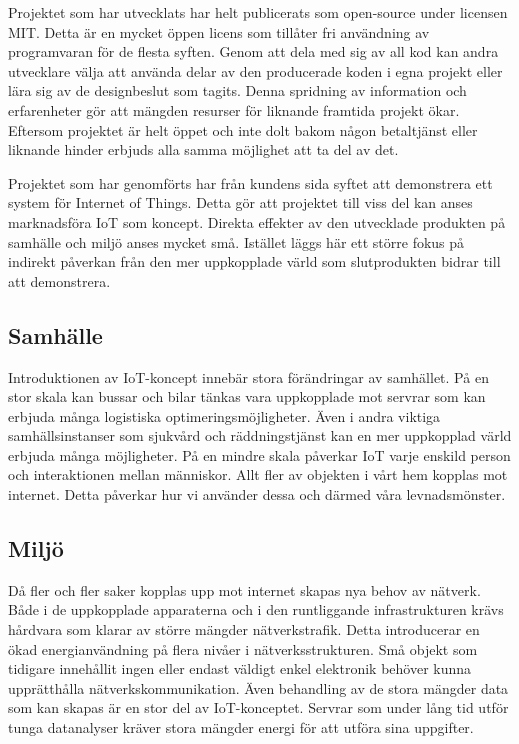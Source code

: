 Projektet som har utvecklats har helt publicerats som open-source under licensen MIT\cite{MIT-license}. Detta är en mycket öppen licens som tillåter fri användning av programvaran för de flesta syften. Genom att dela med sig av all kod kan andra utvecklare välja att använda delar av den producerade koden i egna projekt eller lära sig av de designbeslut som tagits. Denna spridning av information och erfarenheter gör att mängden resurser för liknande framtida projekt ökar. Eftersom projektet är helt öppet och inte dolt bakom någon betaltjänst eller liknande hinder erbjuds alla samma möjlighet att ta del av det.

Projektet som har genomförts har från kundens sida syftet att demonstrera ett system för Internet of Things. Detta gör att projektet till viss del kan anses marknadsföra IoT som koncept. Direkta effekter av den utvecklade produkten på samhälle och miljö anses mycket små. Istället läggs här ett större fokus på indirekt påverkan från den mer uppkopplade värld som slutprodukten bidrar till att demonstrera.

\subsection{Samhälle}
Introduktionen av IoT-koncept innebär stora förändringar av samhället. På en stor skala kan bussar och bilar tänkas vara uppkopplade mot servrar som kan erbjuda många logistiska optimeringsmöjligheter. Även i andra viktiga samhällsinstanser som sjukvård och räddningstjänst kan en mer uppkopplad värld erbjuda många möjligheter. På en mindre skala påverkar IoT varje enskild person och interaktionen mellan människor. Allt fler av objekten i vårt hem kopplas mot internet. Detta påverkar hur vi använder dessa och därmed våra levnadsmönster.

\subsection{Miljö}
Då fler och fler saker kopplas upp mot internet skapas nya behov av nätverk. Både i de uppkopplade apparaterna och i den runtliggande infrastrukturen krävs hårdvara som klarar av större mängder nätverkstrafik. Detta introducerar en ökad energianvändning på flera nivåer i nätverksstrukturen. Små objekt som tidigare innehållit ingen eller endast väldigt enkel elektronik behöver kunna upprätthålla nätverkskommunikation. Även behandling av de stora mängder data som kan skapas är en stor del av IoT-konceptet. Servrar som under lång tid utför tunga datanalyser kräver stora mängder energi för att utföra sina uppgifter.


